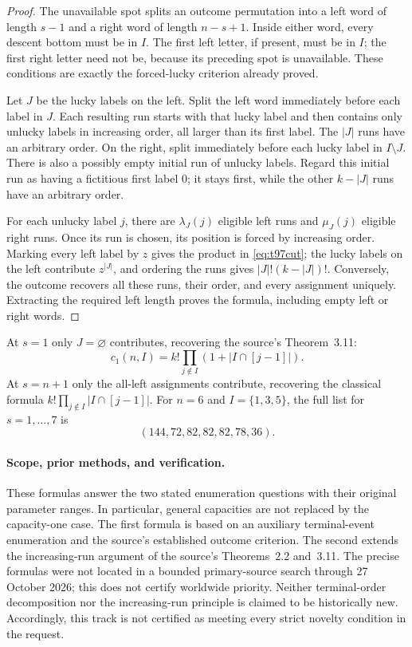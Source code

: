 \documentclass[11pt,a4paper]{article}
\theoremstyle{definition}
\theoremstyle{remark}
\begin{document}
\begin{proof}
The unavailable spot splits an outcome permutation into a left word
of length $s-1$ and a right word of length $n-s+1$. Inside either word,
every descent bottom must be in $I$. The first left letter, if present,
must be in $I$; the first right letter need not be, because its preceding
spot is unavailable. These conditions are exactly the forced-lucky
criterion already proved.

Let $J$ be the lucky labels on the left. Split the left word immediately
before each label in $J$. Each resulting run starts with that lucky
label and then contains only unlucky labels in increasing order, all
larger than its first label. The $|J|$ runs have an arbitrary order.
On the right, split immediately before each lucky label in
$I\setminus J$. There is also a possibly empty initial run of unlucky
labels. Regard this initial run as having a fictitious first label $0$;
it stays first, while the other $k-|J|$ runs have an arbitrary order.

For each unlucky label $j$, there are $\lambda_J(j)$ eligible left
runs and $\mu_J(j)$ eligible right runs. Once its run is chosen, its
position is forced by increasing order. Marking every left label by
$z$ gives the product in \eqref{eq:t97cut}; the lucky labels on the
left contribute $z^{|J|}$, and ordering the runs gives
$|J|!(k-|J|)!$. Conversely, the outcome recovers all these runs,
their order, and every assignment uniquely. Extracting the required
left length proves the formula, including empty left or right words.
\end{proof}

At $s=1$ only $J=\varnothing$ contributes, recovering the source's
Theorem~3.11:
\[
 c_1(n,I)=k!\prod_{j\notin I}(1+|I\cap[j-1]|).
\]
At $s=n+1$ only the all-left assignments contribute, recovering the
classical formula $k!\prod_{j\notin I}|I\cap[j-1]|$.
For $n=6$ and $I=\{1,3,5\}$, the full list for $s=1,\ldots,7$ is
\[
                 (144,72,82,82,82,78,36).
\]

\paragraph{Scope, prior methods, and verification.}
These formulas answer the two stated enumeration questions with their
original parameter ranges. In particular, general capacities are not
replaced by the capacity-one case. The first formula is based on an
auxiliary terminal-event enumeration and the source's established
outcome criterion. The second extends the increasing-run argument of
the source's Theorems~2.2 and~3.11. The precise formulas were not located
in a bounded primary-source search through 27 October 2026; this does
not certify worldwide priority. Neither terminal-order decomposition
nor the increasing-run principle is claimed to be historically new.
Accordingly, this track is not certified as meeting every strict
novelty condition in the request.
\end{document}
